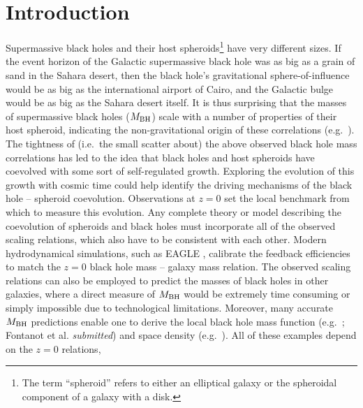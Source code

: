 \documentclass[preprint2]{emulateapj}
\begin{document}
\section{Introduction}
\label{sec:int}
Supermassive black holes and their host spheroids\footnote{The term ``spheroid'' refers to either an elliptical galaxy or the spheroidal component 
of a galaxy with a disk. } 
have very different sizes. 
If the event horizon of the Galactic supermassive black hole was as big as a grain of sand in the Sahara desert, 
then the black hole's gravitational sphere-of-influence would be as big as the international airport of Cairo, 
and the Galactic bulge would be as big as the Sahara desert itself.
It is thus surprising that the masses of supermassive black holes ($M_{\rm BH}$) 
scale with a number of properties of their host spheroid, 
indicating the non-gravitational origin of these correlations 
(e.g.~\citealt{dressler1989,yee1992,kormendyrichstone1995,laor1997,magorrian1998,ferraresemerritt2000,gebhardt2000,graham2001,
marconihunt2003,haringrix2004,grahamscott2015}). \\
The tightness of (i.e.~the small scatter about) the above observed black hole mass correlations has led to the idea
that black holes and host spheroids have coevolved with some sort of self-regulated growth.
Exploring the evolution of this growth with cosmic time could help identify
the driving mechanisms of the black hole -- spheroid coevolution.
Observations at $z=0$ set the local benchmark from which to measure this evolution.
Any complete theory or model describing the coevolution of spheroids and black holes must incorporate 
all of the observed scaling relations, which also have to be consistent with each other.
Modern hydrodynamical simulations, such as EAGLE \citep{schaye2015}, calibrate the feedback efficiencies 
to match the $z=0$ black hole mass -- galaxy mass relation.
The observed scaling relations can also be employed to predict the masses of black holes in other galaxies, where a direct
measure of $M_{\rm BH}$ would be extremely time consuming or simply impossible due to technological limitations.
Moreover, many accurate $M_{\rm BH}$ predictions enable one to derive 
the local black hole mass function (e.g.~\citealt{salucci1999,graham2007smbhmassfunction}; Fontanot et al. \emph{submitted}) 
and space density (e.g.~\citealt{grahamdriver2007smbhmassdensity,comastri2015}). 
All of these examples depend on the $z=0$ relations, 
\end{document}
